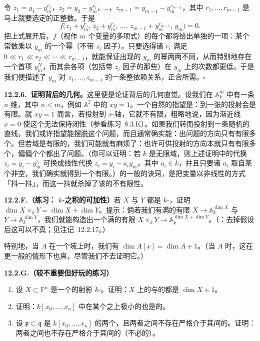 令 $z_1=y_1-y_m^{r_1}$，$z_2=y_2-y_m^{r_2}$，…，$z_{m-1}=y_{m-1}-y_m^{r_{m-1}}$，其中 $r_1,\dots,r_{m-1}$ 是马上就要选定的正整数。于是
\[
f\bigl(z_1+y_m^{r_1},\,z_2+y_m^{r_2},\,\dots,\,z_{m-1}+y_m^{r_{m-1}},\,y_m\bigr)=0.
\]
把上式展开后，$f$（视作 $m$ 个变量的多项式）的每个\trMonomial{}都将给出单独的一项：某个常数乘以 $y_m$ 的一个幂（不带 $z_i$ 因子）。只要选得诸 $r_i$ 满足 $0\ll r_1\ll r_2\ll\cdots\ll r_{m-1}$，就能保证出现的 $y_m$ 的幂两两不同，从而特别地存在一个首项 $y_m^N$，而其余各项（包括带 $z_i$ 因子的那些）在 $y_m$ 上的次数都更低。于是我们便描述了 $y_m$ 对 $z_1,\dots,z_{m-1}$ 的一条整依赖关系，正合所需。\hfill$\square$

\textbf{12.2.6.\ \trNagata{}证明背后的几何。}\quad 这里便是\trNagata{}论证背后的几何直觉。设我们在 $\mathbb{A}^m_k$ 中有一条 $n$ 维\trVariety，其中 $n<m$，例如 $\mathbb{A}^2$ 中的 $xy=1$。一个自然的指望是：到一张\trHyperplane{}的投射会是有限\trMorphism。就 $xy=1$ 而言，若投射到 $x$-轴，它就不有限，粗略地说，因为渐近线 $x=0$ 使这个\trMap{}无法保持闭性（参看\mbox{练习~8.3.K}）。如果我们转而投射到一条随机的直线，我们或许指望能摆脱这个问题，而且通常确实能：出问题的方向只有有限多个。但若域是有限的，我们可能就有麻烦了：也许可供投射的方向本就只有有限多个，偏偏个个都出了问题。（你可以证明：若 $k$ 是无限域，则上述证明中的代换 $z_i=y_i-y_m^{r_i}$ 可换成线性代换 $z_i=y_i-a_iy_m$，其中 $a_i\in k$，并且只要诸 $a_i$ 取自某个非空\trZariski\trOpenSet，我们确实就得到一个有限\trMorphism。）\trNagata{}的一般的诀窍，是把变量以非线性的方式「抖一抖」，而这一抖就杀掉了该\trMap{}的不有限性。

\textbf{12.2.F.（练习：\trFiniteType{} $k$-\trScheme{}之积的\trDimension{}可加性）}\quad 若 $X$ 与 $Y$ 都是\trIrreducible{} $k$-\trVariety，证明 $\dim X\times_k Y=\dim X+\dim Y$。提示：倘若我们有满的有限\trMorphism{} $X\to\mathbb{A}^{\dim X}_k$ 与 $Y\to\mathbb{A}^{\dim Y}_k$，我们就能构造出一个满的有限\trMorphism{} $X\times_k Y\to\mathbb{A}^{\dim X+\dim Y}_k$。（\trhWarning{}：去掉\trFiniteType{}假设后这可以不真；见注记~12.2.17。）

特别地，当 $A$ 在一个域上\trFinitelyGenerated{}时，我们有 $\dim A[x]=\dim A+1$。（当 $A$ \trNoetherian{}时，这在更一般的情形下也真，尽管我们不去证明它。）

\textbf{12.2.G.（较不重要但好玩的练习）}\quad
\begin{enumerate}[label=(\alph*)]
  \item 设 $X\subset\mathbb{P}^n$ 是一个\trIrreducible{}的射影 $k$-\trVariety。证明：$X$ 上的\trAffine\trCone{}与\trProjective\trCone{}的\trDimension{}都是 $\dim X+1$。
  \item 证明：$k[x_0,\dots,x_n]$ 中在某个\trHomogeneous{}\trIdeal{}之上极小的\trPrimeIdeal{}也是\trHomogeneous{}的。
  \item 设 $\mathfrak{p}\subset\mathfrak{q}$ 是 $k[x_0,\dots,x_n]$ 的两个\trHomogeneous{}\trPrimeIdeal，且两者之间不存在严格介于其间的\trHomogeneous{}\trPrimeIdeal。证明：两者之间也不存在严格介于其间的（不必\trHomogeneous{}的）\trPrimeIdeal。
\end{enumerate}


